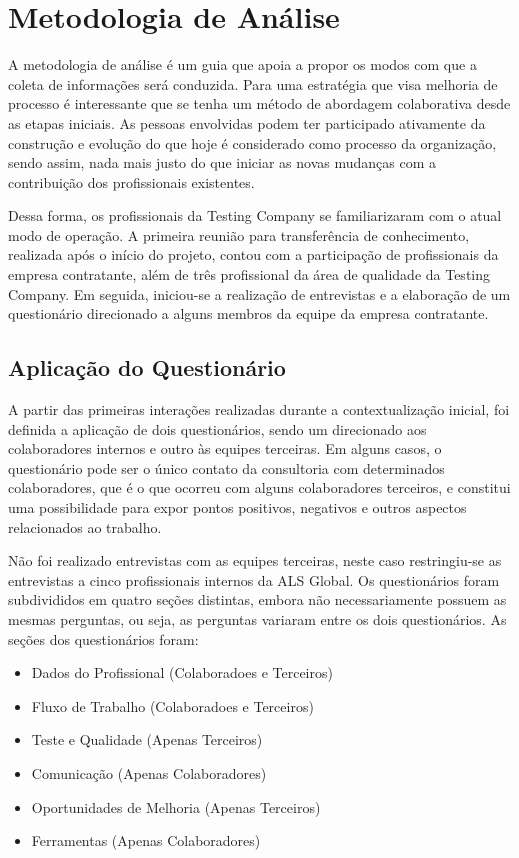 \documentclass[12pt,a4paper]{report}
\begin{document}
\section{Metodologia de Análise}

A metodologia de análise é um guia que apoia a propor os modos com que a coleta de informações será conduzida. Para uma estratégia que visa melhoria de processo é interessante que se tenha um método de abordagem colaborativa desde as etapas iniciais. As pessoas envolvidas podem ter participado ativamente da construção e evolução do que hoje é considerado como processo da organização, sendo assim, nada mais justo do que iniciar as novas mudanças com a contribuição dos profissionais existentes.

Dessa forma, os profissionais da Testing Company se familiarizaram com o atual modo de operação. A primeira reunião para transferência de conhecimento, realizada após o início do projeto, contou com a participação de profissionais da empresa contratante, além de três profissional da área de qualidade da Testing Company. Em seguida, iniciou-se a realização de entrevistas e a elaboração de um questionário direcionado a alguns membros da equipe da empresa contratante.


\subsection{Aplicação do Questionário}

A partir das primeiras interações realizadas durante a contextualização inicial, foi definida a aplicação de dois questionários, sendo um direcionado aos colaboradores internos e outro às equipes terceiras. Em alguns casos, o questionário pode ser o único contato da consultoria com determinados colaboradores, que é o que ocorreu com alguns colaboradores terceiros, e constitui uma possibilidade para expor pontos positivos, negativos e outros aspectos relacionados ao trabalho. 

Não foi realizado entrevistas com as equipes terceiras, neste caso restringiu-se as entrevistas a cinco profissionais internos da ALS Global. Os questionários foram subdivididos em quatro seções distintas, embora não necessariamente possuem as mesmas perguntas, ou seja, as perguntas variaram entre os dois questionários. As seções dos questionários foram:

 \begin{itemize}
 	\item Dados do Profissional (Colaboradoes e Terceiros)
 	\item Fluxo de Trabalho (Colaboradoes e Terceiros) 
 	\item Teste e Qualidade (Apenas Terceiros)
 	\item Comunicação (Apenas Colaboradores)
 	\item Oportunidades de Melhoria (Apenas Terceiros)
 	\item Ferramentas (Apenas Colaboradores)
 \end{itemize}
\end{document}
